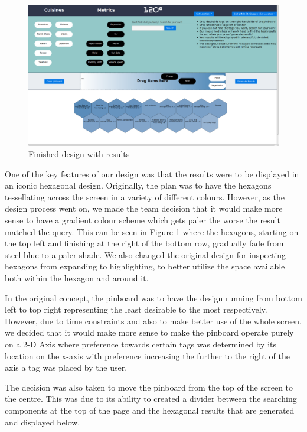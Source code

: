 \documentclass[10pt,a4paper]{article}
\begin{document}
\begin{figure}[H]
	\begin{center}
		\includegraphics[scale=0.2]{newScreenshotWithResults.png}
		\caption{Finished design with results}
		\label{figure:finished-design-with-results}
	\end{center}
\end{figure}

One of the key features of our design was that the results were to be displayed in an iconic hexagonal design. Originally, the plan was to have the hexagons tessellating across the screen in a variety of different colours. However, as the design process went on, we made the team decision that it would make more sense to have a gradient colour scheme which gets paler the worse the result matched the query. This can be seen in Figure \ref{figure:finished-design-with-results} where the hexagons, starting on the top left and finishing at the right of the bottom row, gradually fade from steel blue to a paler shade. We also changed the original design for inspecting hexagons from expanding to highlighting, to better utilize the space available both within the hexagon and around it.

In the original concept, the pinboard was to have the design running from bottom left to top right representing the least desirable to the most respectively. However, due to time constraints and also to make better use of the whole screen, we decided that it would make more sense to make the pinboard operate purely on a 2-D Axis where preference towards certain tags was determined by its location on the x-axis with preference increasing the further to the right of the axis a tag was placed by the user.

The decision was also taken to move the pinboard from the top of the screen to the centre. This was due to its ability to created a divider between the searching components at the top of the page and the hexagonal results that are generated and displayed below.
\end{document}
